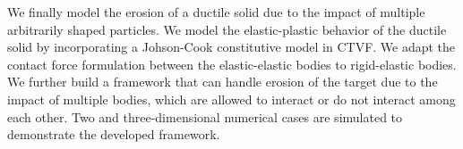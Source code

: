 \begin{Abstract}
  We finally model the erosion of a ductile solid due to the impact of multiple
  arbitrarily shaped particles. We model the elastic-plastic behavior of the
  ductile solid by incorporating a Johson-Cook constitutive model in CTVF. We
  adapt the contact force formulation between the elastic-elastic bodies to
  rigid-elastic bodies. We further build a framework that can handle erosion of
  the target due to the impact of multiple bodies, which are allowed to interact
  or do not interact among each other. Two and three-dimensional numerical cases
  are simulated to demonstrate the developed framework.
%
%
%
%
%
\end{Abstract}
